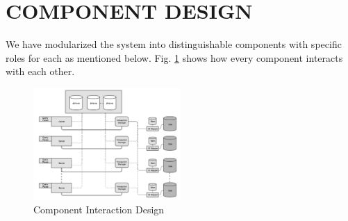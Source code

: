 \documentclass[letterpaper, 11 pt, conference]{ieeeconf}  %
\begin{document}
\section{COMPONENT DESIGN}
We have modularized the system into distinguishable components with specific roles for each as mentioned below. Fig. \ref{fig:comp} shows how every component interacts with each other.
\begin{figure}
 \centering
  \includegraphics[width=0.5\textwidth]{comp.png}
\caption{Component Interaction Design}
\label{fig:comp}
\end{figure}
\end{document}
